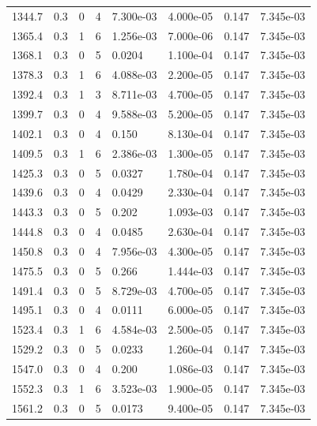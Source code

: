 \documentclass[preview]{standalone}
\begin{document}
{{{{{\begin{tabular}{L{1.2cm}C{1.2cm} C{0.3cm}C{0.5cm} C{1.4cm}C{1.4cm} C{1.4cm}C{1.4cm}}
  1344.7  &   0.3  & 0     &  4 &  7.300e-03  & 4.000e-05  & 0.147 &  7.345e-03   \\ 
  1365.4  &   0.3  & 1     &  6 &  1.256e-03  & 7.000e-06  & 0.147 &  7.345e-03   \\ 
  1368.1  &   0.3  & 0     &  5 &  0.0204  & 1.100e-04  & 0.147 &  7.345e-03   \\ 
  1378.3  &   0.3  & 1     &  6 &  4.088e-03  & 2.200e-05  & 0.147 &  7.345e-03   \\ 
  1392.4  &   0.3  & 1     &  3 &  8.711e-03  & 4.700e-05  & 0.147 &  7.345e-03   \\ 
  1399.7  &   0.3  & 0     &  4 &  9.588e-03  & 5.200e-05  & 0.147 &  7.345e-03   \\ 
  1402.1  &   0.3  & 0     &  4 &  0.150  & 8.130e-04  & 0.147 &  7.345e-03   \\ 
  1409.5  &   0.3  & 1     &  6 &  2.386e-03  & 1.300e-05  & 0.147 &  7.345e-03   \\ 
  1425.3  &   0.3  & 0     &  5 &  0.0327  & 1.780e-04  & 0.147 &  7.345e-03   \\ 
  1439.6  &   0.3  & 0     &  4 &  0.0429  & 2.330e-04  & 0.147 &  7.345e-03   \\ 
  1443.3  &   0.3  & 0     &  5 &  0.202  & 1.093e-03  & 0.147 &  7.345e-03   \\ 
  1444.8  &   0.3  & 0     &  4 &  0.0485  & 2.630e-04  & 0.147 &  7.345e-03   \\ 
  1450.8  &   0.3  & 0     &  4 &  7.956e-03  & 4.300e-05  & 0.147 &  7.345e-03   \\ 
  1475.5  &   0.3  & 0     &  5 &  0.266  & 1.444e-03  & 0.147 &  7.345e-03   \\ 
  1491.4  &   0.3  & 0     &  5 &  8.729e-03  & 4.700e-05  & 0.147 &  7.345e-03   \\ 
  1495.1  &   0.3  & 0     &  4 &  0.0111  & 6.000e-05  & 0.147 &  7.345e-03   \\ 
  1523.4  &   0.3  & 1     &  6 &  4.584e-03  & 2.500e-05  & 0.147 &  7.345e-03   \\ 
  1529.2  &   0.3  & 0     &  5 &  0.0233  & 1.260e-04  & 0.147 &  7.345e-03   \\ 
  1547.0  &   0.3  & 0     &  4 &  0.200  & 1.086e-03  & 0.147 &  7.345e-03   \\ 
  1552.3  &   0.3  & 1     &  6 &  3.523e-03  & 1.900e-05  & 0.147 &  7.345e-03   \\ 
  1561.2  &   0.3  & 0     &  5 &  0.0173  & 9.400e-05  & 0.147 &  7.345e-03   \\ 

\end{tabular}}}}}}
\end{document}
